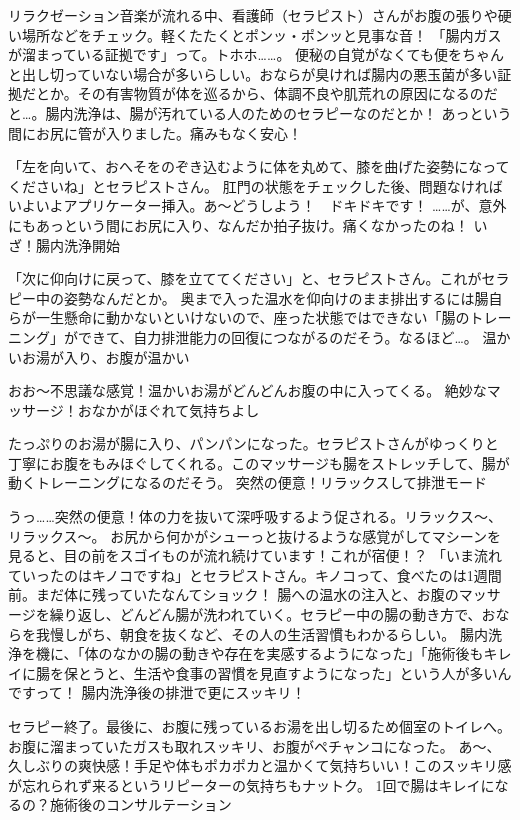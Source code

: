 リラクゼーション音楽が流れる中、看護師（セラピスト）さんがお腹の張りや硬い場所などをチェック。軽くたたくとポンッ・ポンッと見事な音！
「腸内ガスが溜まっている証拠です」って。トホホ……。
便秘の自覚がなくても便をちゃんと出し切っていない場合が多いらしい。おならが臭ければ腸内の悪玉菌が多い証拠だとか。その有害物質が体を巡るから、体調不良や肌荒れの原因になるのだと…。腸内洗浄は、腸が汚れている人のためのセラピーなのだとか！
あっという間にお尻に管が入りました。痛みもなく安心！

「左を向いて、おへそをのぞき込むように体を丸めて、膝を曲げた姿勢になってくださいね」とセラピストさん。
肛門の状態をチェックした後、問題なければいよいよアプリケーター挿入。あ～どうしよう！　ドキドキです！
……が、意外にもあっという間にお尻に入り、なんだか拍子抜け。痛くなかったのね！
いざ！腸内洗浄開始

「次に仰向けに戻って、膝を立ててください」と、セラピストさん。これがセラピー中の姿勢なんだとか。
奥まで入った温水を仰向けのまま排出するには腸自らが一生懸命に動かないといけないので、座った状態ではできない「腸のトレーニング」ができて、自力排泄能力の回復につながるのだそう。なるほど…。
温かいお湯が入り、お腹が温かい

おお～不思議な感覚！温かいお湯がどんどんお腹の中に入ってくる。
絶妙なマッサージ！おなかがほぐれて気持ちよし

たっぷりのお湯が腸に入り、パンパンになった。セラピストさんがゆっくりと丁寧にお腹をもみほぐしてくれる。このマッサージも腸をストレッチして、腸が動くトレーニングになるのだそう。
突然の便意！リラックスして排泄モード

うっ……突然の便意！体の力を抜いて深呼吸するよう促される。リラックス～、リラックス～。
お尻から何かがシューっと抜けるような感覚がしてマシーンを見ると、目の前をスゴイものが流れ続けています！これが宿便！？
「いま流れていったのはキノコですね」とセラピストさん。キノコって、食べたのは1週間前。まだ体に残っていたなんてショック！
腸への温水の注入と、お腹のマッサージを繰り返し、どんどん腸が洗われていく。セラピー中の腸の動き方で、おならを我慢しがち、朝食を抜くなど、その人の生活習慣もわかるらしい。
腸内洗浄を機に、「体のなかの腸の動きや存在を実感するようになった」「施術後もキレイに腸を保とうと、生活や食事の習慣を見直すようになった」という人が多いんですって！
腸内洗浄後の排泄で更にスッキリ！

セラピー終了。最後に、お腹に残っているお湯を出し切るため個室のトイレへ。　お腹に溜まっていたガスも取れスッキリ、お腹がペチャンコになった。
あ～、久しぶりの爽快感！手足や体もポカポカと温かくて気持ちいい！このスッキリ感が忘れられず来るというリピーターの気持ちもナットク。
1回で腸はキレイになるの？施術後のコンサルテーション

